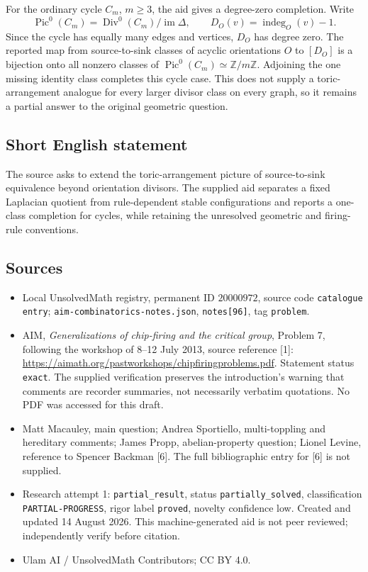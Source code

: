 \documentclass[11pt]{article}
\newcommand{\Z}{\mathbb{Z}}
\begin{document}
For the ordinary cycle \(C_m\), \(m\ge3\), the aid gives a degree-zero completion. Write
\[
 \operatorname{Pic}^0(C_m)=\operatorname{Div}^0(C_m)/\operatorname{im}\Delta,
 \qquad D_O(v)=\operatorname{indeg}_O(v)-1.
\]
Since the cycle has equally many edges and vertices, \(D_O\) has degree zero. The reported map from source-to-sink classes of acyclic orientations \(O\) to \([D_O]\) is a bijection onto all nonzero classes of \(\operatorname{Pic}^0(C_m)\simeq\Z/m\Z\). Adjoining the one missing identity class completes this cycle case. This does not supply a toric-arrangement analogue for every larger divisor class on every graph, so it remains a partial answer to the original geometric question.
\subsection{Short English statement}
The source asks to extend the toric-arrangement picture of source-to-sink equivalence beyond orientation divisors. The supplied aid separates a fixed Laplacian quotient from rule-dependent stable configurations and reports a one-class completion for cycles, while retaining the unresolved geometric and firing-rule conventions.
\subsection{Sources}
\begin{itemize}
\item Local UnsolvedMath registry, permanent ID \(20000972\), source code \texttt{catalogue entry}; \texttt{aim-combinatorics-notes.json}, \texttt{notes[96]}, tag \texttt{problem}.
\item AIM, \emph{Generalizations of chip-firing and the critical group}, Problem 7, following the workshop of 8--12 July 2013, source reference [1]: \url{https://aimath.org/pastworkshops/chipfiringproblems.pdf}. Statement status \texttt{exact}. The supplied verification preserves the introduction's warning that comments are recorder summaries, not necessarily verbatim quotations. No PDF was accessed for this draft.
\item Matt Macauley, main question; Andrea Sportiello, multi-toppling and hereditary comments; James Propp, abelian-property question; Lionel Levine, reference to Spencer Backman [6]. The full bibliographic entry for [6] is not supplied.
\item Research attempt 1: \texttt{partial\_result}, status \texttt{partially\_solved}, classification \texttt{PARTIAL-PROGRESS}, rigor label \texttt{proved}, novelty confidence low. Created and updated 14 August 2026. This machine-generated aid is not peer reviewed; independently verify before citation.
\item Ulam AI / UnsolvedMath Contributors; CC BY 4.0.
\end{itemize}
\end{document}
